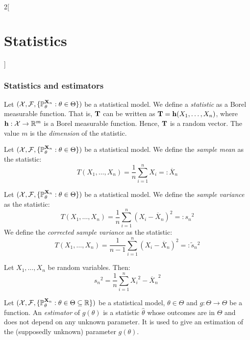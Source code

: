 \documentclass[../../../main.tex]{subfiles}
\begin{document}
\begin{multicols}{2}[\section{Statistics}]
  \subsubsection{Statistics and estimators}
  \begin{definition}[Statistic]
    Let $(\mathcal{X},\mathcal{F},\{\mathbb{P}_\theta^{\boldsymbol{\mathrm{X}}_n}:\theta\in\Theta\})$ be a statistical model. We define a \emph{statistic} as a Borel measurable function. That is, $\boldsymbol{\mathrm{T}}$ can be written as $\boldsymbol{\mathrm{T}}=\boldsymbol{\mathrm{h}}(X_1,\ldots,X_n)$, where $\boldsymbol{\mathrm{h}}:\mathcal{X}\rightarrow\mathbb{R}^m$ is a Borel measurable function. Hence, $\boldsymbol{\mathrm{T}}$ is a random vector. The value $m$ is the \emph{dimension} of the statistic.
  \end{definition}
  \begin{definition}
    Let $(\mathcal{X},\mathcal{F},\{\mathbb{P}_\theta^{\boldsymbol{\mathrm{X}}_n}:\theta\in\Theta\})$ be a statistical model. We define the \emph{sample mean} as the statistic: $$T(X_1,\ldots,X_n)=\frac{1}{n}\sum_{i=1}^nX_i=:\overline{X}_n$$
  \end{definition}
  \begin{definition}
    Let $(\mathcal{X},\mathcal{F},\{\mathbb{P}_\theta^{\boldsymbol{\mathrm{X}}_n}:\theta\in\Theta\})$ be a statistical model. We define the \emph{sample variance} as the statistic: $$T(X_1,\ldots,X_n)=\frac{1}{n}\sum_{i=1}^n{(X_i-\overline{X}_n)}^2=:{s_n}^2$$ We define the \emph{corrected sample variance} as the statistic:
    $$T(X_1,\ldots,X_n)=\frac{1}{n-1}\sum_{i=1}^n{(X_i-\overline{X}_n)}^2=:\tilde{s}_n{}^2$$
  \end{definition}
  \begin{proposition}
    Let $X_1,\ldots,X_n$ be random variables. Then: $${s_n}^2=\frac{1}{n}\sum_{i=1}^n{X_i}^2-{\overline{X}_n}^2$$
  \end{proposition}
  \begin{definition}
    Let $(\mathcal{X},\mathcal{F},\{\mathbb{P}_{\theta}^{\boldsymbol{\mathrm{X}}_n}:{\theta}\in\Theta\subseteq \mathbb{R}\})$ be a statistical model, ${\theta} \in\Theta$ and $g:\Theta\rightarrow\Theta$ be a function. An \emph{estimator} of $g({\theta})$ is a statistic ${\hat\theta}$ whose outcomes are in $\Theta$ and does not depend on any unknown parameter. It is used to give an estimation of the (supposedly unknown) parameter $g({\theta})$.
  \end{definition}

\end{multicols}
\end{document}
